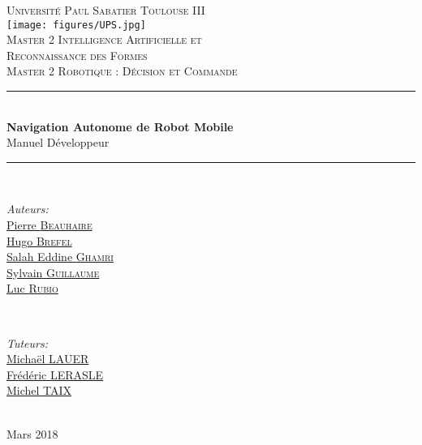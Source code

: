 \documentclass[10pt,a4paper]{article}
\begin{document}
\pagestyle {plain}

\begin{titlepage}


\newcommand{\HRule}{\rule{\linewidth}{0.5mm}} 

\center

\textsc{\Large Université Paul Sabatier Toulouse III}\\[1cm] 
\texttt{[image: figures/UPS.jpg]}\\[0.6cm] 


\textsc{Master 2 Intelligence Artificielle et \\ 
Reconnaissance des Formes \\ Master 2 Robotique : Décision et Commande}\\[3cm] 

\HRule \\[0.4cm]
{ \huge \bfseries Navigation Autonome de Robot Mobile}\\[0.4cm] 
\LARGE Manuel Développeur
\HRule \\[1.5cm]
 

\begin{minipage}{0.4\textwidth}
\begin{flushleft} \large
\emph{Auteurs:}\\
\href{mailto:beauhaire.pierre@gmail.com}{Pierre \textsc{Beauhaire} }  \\
\href{mailto:brefel.hugo@gmail.com}{Hugo \textsc{Brefel} }  \\
\href{mailto:salaheddineghamri@gmail.com}{Salah Eddine \textsc{Ghamri} } \\
\href{mailto:sylvain31g@free.fr}{Sylvain \textsc{Guillaume} } \\
\href{mailto:luc.rubio.lr@gmail.com}{Luc \textsc{Rubio} } 
\end{flushleft}
\end{minipage}
~
\begin{minipage}{0.4\textwidth}
\begin{flushright} \large
\emph{Tuteurs:} \\
\href{mailto:michael.lauer@laas.fr}{Michaël \textsc{LAUER}} \\
\href{mailto:lerasle@laas.fr}{Frédéric \textsc{LERASLE}}\\
\href{mailto:taix@laas.f}{Michel \textsc{TAIX}}
\end{flushright}
\end{minipage}\\[5cm]

\large Mars 2018
 

\end{titlepage}
\end{document}
